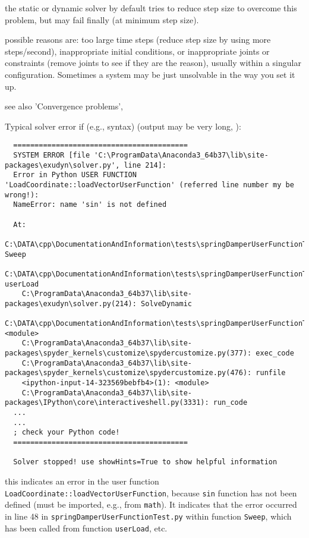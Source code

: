 \item[$\ra$] the static or dynamic solver by default tries to reduce step size to overcome this problem, but may fail finally (at minimum step size).
\item[$\ra$] possible reasons are: too large time steps (reduce step size by using more steps/second), inappropriate initial conditions, or inappropriate joints or constraints (remove joints to see if they are the reason), usually within a singular configuration. Sometimes a system may be just unsolvable in the way you set it up.
\item[$\ra$] see also 'Convergence problems', 
\ei
\item Typical solver error if (e.g., syntax)  (output may be very long, ):
\begin{lstlisting}
  =========================================
  SYSTEM ERROR [file 'C:\ProgramData\Anaconda3_64b37\lib\site-packages\exudyn\solver.py', line 214]: 
  Error in Python USER FUNCTION 'LoadCoordinate::loadVectorUserFunction' (referred line number my be wrong!):
  NameError: name 'sin' is not defined

  At:
    C:\DATA\cpp\DocumentationAndInformation\tests\springDamperUserFunctionTest.py(48): Sweep
    C:\DATA\cpp\DocumentationAndInformation\tests\springDamperUserFunctionTest.py(54): userLoad
    C:\ProgramData\Anaconda3_64b37\lib\site-packages\exudyn\solver.py(214): SolveDynamic
    C:\DATA\cpp\DocumentationAndInformation\tests\springDamperUserFunctionTest.py(106): <module>
    C:\ProgramData\Anaconda3_64b37\lib\site-packages\spyder_kernels\customize\spydercustomize.py(377): exec_code
    C:\ProgramData\Anaconda3_64b37\lib\site-packages\spyder_kernels\customize\spydercustomize.py(476): runfile
    <ipython-input-14-323569bebfb4>(1): <module>
    C:\ProgramData\Anaconda3_64b37\lib\site-packages\IPython\core\interactiveshell.py(3331): run_code
  ...
  ...
  ; check your Python code!
  =========================================

  Solver stopped! use showHints=True to show helpful information
\end{lstlisting}
\onlyRST{\rstStartNewLine}
%
\bi
\item[$\ra$] this indicates an error in the user function \texttt{LoadCoordinate::loadVectorUserFunction}, because \texttt{sin} function has not been defined (must be imported, e.g., from \texttt{math}). It indicates that the error occurred in line 48 in \texttt{springDamperUserFunctionTest.py} within function \texttt{Sweep}, which has been called from function \texttt{userLoad}, etc.
